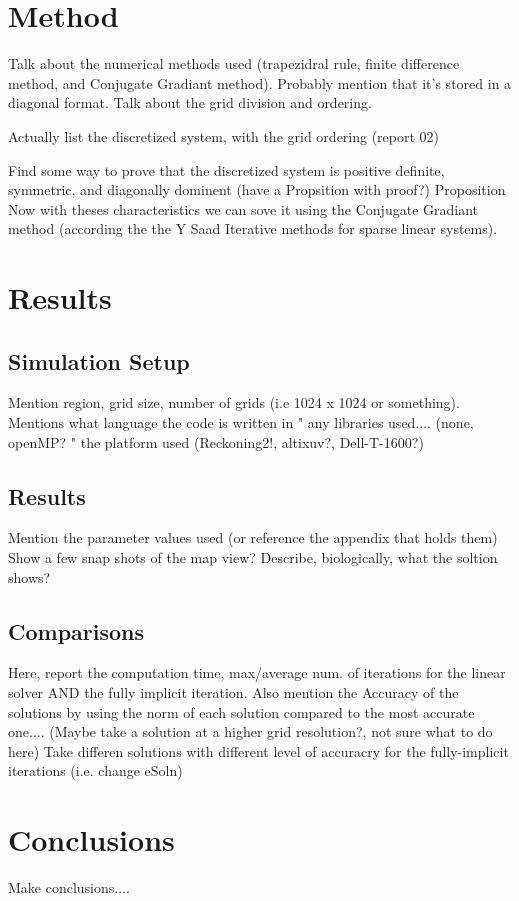\documentclass{article}
\begin{document}
\section{Method}
  Talk about the numerical methods used (trapezidral rule, finite difference method, and Conjugate Gradiant method). 
  Probably mention that it's stored in a diagonal format.
  Talk about the grid division and ordering.

  Actually list the discretized system, with the grid ordering (report 02)

  Find some way to prove that the discretized system is positive definite, symmetric, and diagonally dominent (have a Propsition with proof?)
  Proposition \cite{eberl2007finite}  \cite{eberl2001deterministic}
  Now with theses characteristics we can sove it using the Conjugate Gradiant method (according the the Y Saad Iterative methods for sparse linear systems).

\section{Results}
  \subsection{Simulation Setup}
    Mention region, grid size, number of grids (i.e 1024 x 1024 or something).
    Mentions what language the code is written in
    " any libraries used.... (none, openMP?
    " the platform used (Reckoning2!, altixuv?, Dell-T-1600?)

  \subsection{Results}
    Mention the parameter values used (or reference the appendix that holds them)
    Show a few snap shots of the map view?
    Describe, biologically, what the soltion shows?

  \subsection{Comparisons}
    Here, report the computation time, max/average num. of iterations for the linear solver AND the fully implicit iteration.
    Also mention the Accuracy of the solutions by using the norm of each solution compared to the  most accurate one.... (Maybe take a solution at a higher grid resolution?, not sure what to do here)
    Take differen solutions with different level of accuracry for the fully-implicit iterations (i.e. change eSoln)

\section{Conclusions}
  Make conclusions....
  




\end{document}
